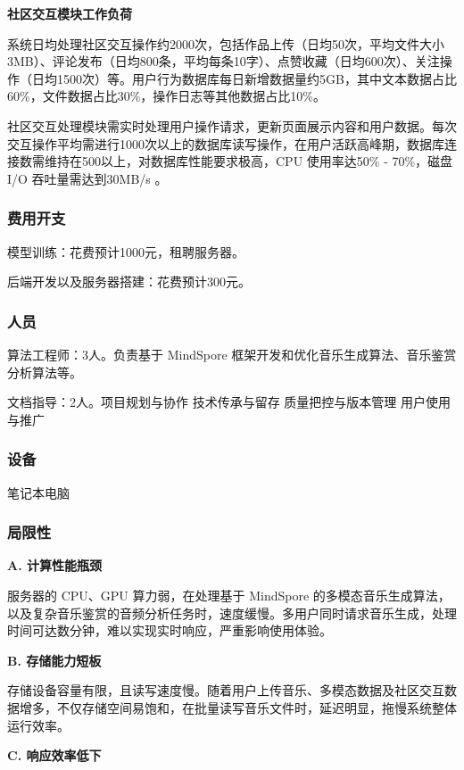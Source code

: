 \documentclass{base}
\numberwithin{figure}{section} %
\begin{document}
\textbf{社区交互模块工作负荷}

系统日均处理社区交互操作约2000次，包括作品上传（日均50次，平均文件大小3MB）、评论发布（日均800条，平均每条10字）、点赞收藏（日均600次）、关注操作（日均1500次）等。用户行为数据库每日新增数据量约5GB，其中文本数据占比60\%，文件数据占比30\%，操作日志等其他数据占比10\%。​

社区交互处理模块需实时处理用户操作请求，更新页面展示内容和用户数据。每次交互操作平均需进行1000次以上的数据库读写操作，在用户活跃高峰期，数据库连接数需维持在500以上，对数据库性能要求极高，CPU 使用率达50\% - 70\%，磁盘 I/O 吞吐量需达到30MB/s 。

\subsubsection{费用开支}

模型训练：花费预计1000元，租聘服务器。

后端开发以及服务器搭建：花费预计300元。

\subsubsection{人员}

算法工程师：3人。负责基于 MindSpore 框架开发和优化音乐生成算法、音乐鉴赏分析算法等。

文档指导：2人。项目规划与协作 技术传承与留存 质量把控与版本管理 用户使用与推广

\subsubsection{设备}

笔记本电脑

\subsubsection{局限性}

\textbf{A. 计算性能瓶颈​}

服务器的 CPU、GPU 算力弱，在处理基于 MindSpore 的多模态音乐生成算法，以及复杂音乐鉴赏的音频分析任务时，速度缓慢。多用户同时请求音乐生成，处理时间可达数分钟，难以实现实时响应，严重影响使用体验。​

\textbf{B. 存储能力短板​}

存储设备容量有限，且读写速度慢。随着用户上传音乐、多模态数据及社区交互数据增多，不仅存储空间易饱和，在批量读写音乐文件时，延迟明显，拖慢系统整体运行效率。

\textbf{C. 响应效率低下​}
\end{document}
